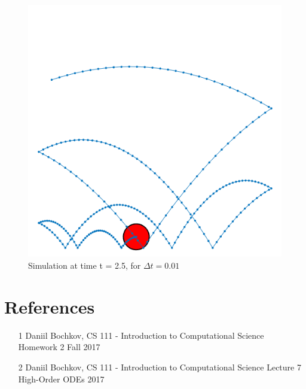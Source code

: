 \documentclass[12pt]{article}
\begin{document}
\begin{figure}[h]
\begin{center}
\includegraphics[width=.3\textwidth]{25}
\end{center}
\caption{Simulation at time t = 2.5, for $\Delta t = 0.01$} \label{fig::MyFigure}
\end{figure}








\newpage
\clearpage
\setcounter{page}{1} \pagestyle{empty}
\section{References}\label{sec::References}
\begin{itemize}
\item [1] Daniil Bochkov, CS 111 - Introduction to Computational Science Homework 2 Fall 2017
\item [2] Daniil Bochkov, CS 111 - Introduction to Computational Science Lecture 7 High-Order ODEs 2017

\end{itemize}


\end{document}
